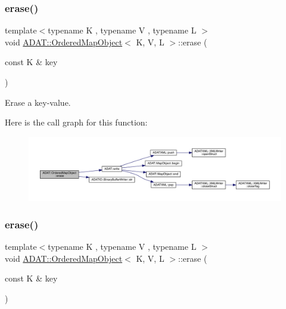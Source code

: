 \subsubsection{\texorpdfstring{erase()}{erase()}\hspace{0.1cm}{\footnotesize\ttfamily [1/2]}}
{\footnotesize\ttfamily template$<$typename K , typename V , typename L $>$ \\
void \mbox{\hyperlink{classADAT_1_1OrderedMapObject}{A\+D\+A\+T\+::\+Ordered\+Map\+Object}}$<$ K, V, L $>$\+::erase (\begin{DoxyParamCaption}\item[{const K \&}]{key }\end{DoxyParamCaption})\hspace{0.3cm}{\ttfamily [inline]}}



Erase a key-\/value. 

Here is the call graph for this function\+:
\nopagebreak
\begin{figure}[H]
\begin{center}
\leavevmode
\includegraphics[width=350pt]{db/d8c/classADAT_1_1OrderedMapObject_af5d9aad7f7a1ce462dfed9cbe13c638c_cgraph}
\end{center}
\end{figure}
\mbox{\label{classADAT_1_1OrderedMapObject_af5d9aad7f7a1ce462dfed9cbe13c638c}} 
\subsubsection{\texorpdfstring{erase()}{erase()}\hspace{0.1cm}{\footnotesize\ttfamily [2/2]}}
{\footnotesize\ttfamily template$<$typename K , typename V , typename L $>$ \\
void \mbox{\hyperlink{classADAT_1_1OrderedMapObject}{A\+D\+A\+T\+::\+Ordered\+Map\+Object}}$<$ K, V, L $>$\+::erase (\begin{DoxyParamCaption}\item[{const K \&}]{key }\end{DoxyParamCaption})\hspace{0.3cm}{\ttfamily [inline]}}



